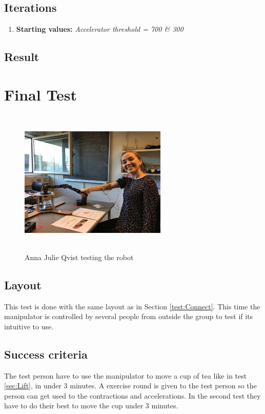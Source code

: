 \subsection*{Iterations}
\begin{enumerate}
    \item {\textbf{Starting values:} \textit{Accelerator threshold = 700 \& 300 }}
\end{enumerate}
\subsection*{Result}
\newpage


\section{Final Test}

\begin{figure}[H]
    \centering
    \includegraphics[width=7cm,height=7cm]{Figures/Technical_figures/anna.jpg}
    \caption{Anna Julie Qvist testing the robot}
    \label{fig:Anna}
\end{figure}

\subsection*{Layout}
This test is done with the same layout as in Section \ref{test:Connect}. This time the manipulator is controlled by several people from outside the group to test if its intuitive to use.
\subsection*{Success criteria}
 The test person have to use the manipulator to move a cup of tea like in test \ref{sec:Lift}, in under 3 minutes. A exercise round is given to the test person so the person can get used to the contractions and accelerations. In the second test they have to do their best to move the cup under 3 minutes.
